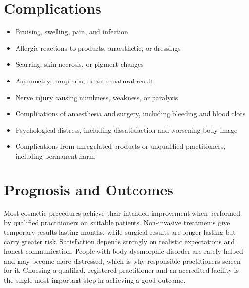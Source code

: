 \section*{Complications}
\begin{itemize}
    \item Bruising, swelling, pain, and infection
    \item Allergic reactions to products, anaesthetic, or dressings
    \item Scarring, skin necrosis, or pigment changes
    \item Asymmetry, lumpiness, or an unnatural result
    \item Nerve injury causing numbness, weakness, or paralysis
    \item Complications of anaesthesia and surgery, including bleeding and blood clots
    \item Psychological distress, including dissatisfaction and worsening body image
    \item Complications from unregulated products or unqualified practitioners, including permanent harm
\end{itemize}

\section*{Prognosis and Outcomes}
Most cosmetic procedures achieve their intended improvement when performed by qualified practitioners on suitable patients. Non-invasive treatments give temporary results lasting months, while surgical results are longer lasting but carry greater risk. Satisfaction depends strongly on realistic expectations and honest communication. People with body dysmorphic disorder are rarely helped and may become more distressed, which is why responsible practitioners screen for it. Choosing a qualified, registered practitioner and an accredited facility is the single most important step in achieving a good outcome.

